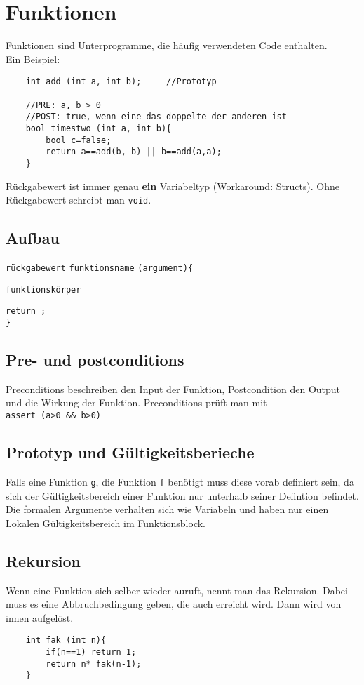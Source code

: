 \section{Funktionen}
Funktionen sind Unterprogramme, die häufig verwendeten Code enthalten.\\
Ein Beispiel:
\begin{lstlisting}
	int add (int a, int b); 	//Prototyp
	
	//PRE: a, b > 0
	//POST: true, wenn eine das doppelte der anderen ist
	bool timestwo (int a, int b){
		bool c=false;
		return a==add(b, b) || b==add(a,a);
	}
\end{lstlisting}
Rückgabewert ist immer genau \textbf{ein} Variabeltyp (Workaround: Structs). Ohne Rückgabewert schreibt man \texttt{void}.
\subsection{Aufbau}
\texttt{rückgabewert} \texttt{funktionsname} \texttt{(argument)}\texttt{\{}

\hspace{10pt}\texttt{funktionskörper}

\hspace{10pt}\texttt{return ;}\\
\texttt{\}}
\subsection{Pre- und postconditions}
Preconditions beschreiben den Input der Funktion, Postcondition den Output und die Wirkung der Funktion. Preconditions prüft man mit\\ \texttt{assert (a>0 \&\& b>0)}
\subsection{Prototyp und Gültigkeitsberieche}
Falls eine Funktion \texttt{g}, die Funktion \texttt{f} benötigt muss diese vorab definiert sein, da sich der Gültigkeitsbereich einer Funktion nur unterhalb seiner Defintion befindet. Die formalen Argumente verhalten sich wie Variabeln und haben nur einen Lokalen Gültigkeitsbereich im Funktionsblock.
\subsection{Rekursion}
Wenn eine Funktion sich selber wieder auruft, nennt man das Rekursion. Dabei muss es eine Abbruchbedingung geben, die auch erreicht wird. Dann wird von innen aufgelöst.
\begin{lstlisting}
	int fak (int n){
		if(n==1) return 1;
		return n* fak(n-1);
	}
\end{lstlisting}



